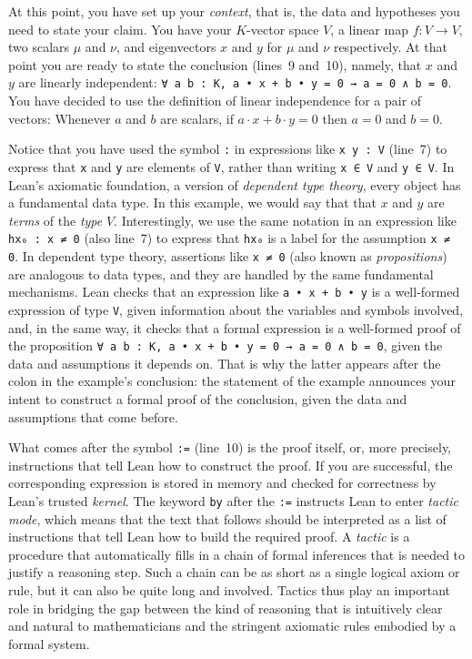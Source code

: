 \documentclass[11pt]{article}
\begin{document}
At this point, you have set up your \emph{context}, that is, the data and hypotheses you need to state your claim.
You have your $K$-vector space $V$, a linear map $f : V \to V$, two scalars $\mu$ and $\nu$, and eigenvectors $x$ and $y$ for $\mu$ and $\nu$ respectively.
At that point you are ready to state the conclusion (lines~9 and~10),
namely, that $x$ and $y$ are linearly independent: \lstinline{∀ a b : K, a • x + b • y = 0 → a = 0 ∧ b = 0}.
You have decided to use the definition of linear independence for a pair of vectors: Whenever $a$ and $b$ are scalars, if $a \cdot x + b \cdot y = 0$ then $a = 0$ and $b = 0$.

Notice that you have used the symbol \lstinline{:} in expressions like \lstinline{x y : V} (line~7) to express that \lstinline{x} and \lstinline{y} are elements of \lstinline{V},
rather than writing \lstinline{x ∈ V} and \lstinline{y ∈ V}.
In Lean's axiomatic foundation, a version of \emph{dependent type theory}, every object has a fundamental data type.
In this example, we would say that that $x$ and $y$ are \emph{terms} of the \emph{type} $V$.
Interestingly, we use the same notation in an expression like \lstinline{hx₀ : x ≠ 0} (also line~7) to express that \lstinline{hx₀} is a label for the assumption \lstinline{x ≠ 0}.
In dependent type theory, assertions like \lstinline{x ≠ 0} (also known as \emph{propositions}) are analogous to data types, and they are handled by the same fundamental mechanisms.
Lean checks that an expression like \lstinline{a • x + b • y} is a well-formed expression of type \lstinline{V}, given information about the variables and symbols involved, and, in the same way, it checks that a formal expression is a well-formed proof of the proposition \lstinline{∀ a b : K, a • x + b • y = 0 → a = 0 ∧ b = 0}, given the data and assumptions it depends on.
That is why the latter appears after the colon in the example's conclusion: the statement of the example announces your intent to construct a formal proof of the conclusion, given the data and assumptions that come before.

What comes after the symbol \lstinline{:=} (line~10) is the proof itself, or, more precisely, instructions that tell Lean how to construct the proof.
If you are successful, the corresponding expression is stored in memory and checked for correctness by Lean's trusted \emph{kernel}.
The keyword \lstinline{by} after the \lstinline{:=} instructs Lean to enter \emph{tactic mode}, which means that the text that follows should be interpreted as a list of instructions that tell Lean how to build the required proof.
A \emph{tactic} is a procedure that automatically fills in a chain of formal inferences that
is needed to justify a reasoning step.
Such a chain can be as short as a single logical axiom or rule, but it
can also be quite long and involved.
Tactics thus play an important role in bridging the gap between the kind of reasoning that
is intuitively clear and natural to mathematicians and the stringent axiomatic rules
embodied by a formal system.
\end{document}
